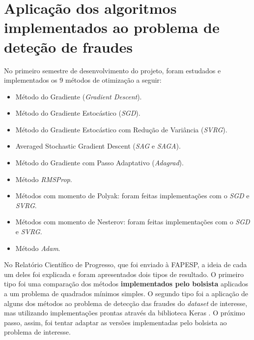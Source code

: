 \documentclass[11pt]{article}
\begin{document}
\section{Aplicação dos algoritmos implementados ao problema de deteção de fraudes}
No primeiro semestre de desenvolvimento do projeto, foram estudados e implementados os 9 métodos de otimização a seguir:
\begin{itemize}
\item Método do Gradiente (\textit{Gradient Descent}).
\item Método do Gradiente Estocástico (\textit{SGD}).
\item Método do Gradiente Estocástico com Redução de Variância (\textit{SVRG}).
\item Averaged Stochastic Gradient Descent (\textit{SAG} e \textit{SAGA}).
\item Método do Gradiente com Passo Adaptativo (\textit{Adagrad}).
\item Método \textit{RMSProp}.
\item Métodos com momento de Polyak: foram feitas implementações com o \textit{SGD} e \textit{SVRG}.
\item Métodos com momento de Nesterov: foram feitas implementações com o \textit{SGD} e \textit{SVRG}.
\item Método \textit{Adam}.
\end{itemize}
No Relatório Científico de Progresso, que foi enviado à FAPESP, a ideia de cada um deles foi explicada e foram apresentados dois tipos de resultado. O primeiro tipo foi uma comparação dos métodos \textbf{implementados pelo bolsista} aplicados a um problema de quadrados mínimos simples. O segundo tipo foi a aplicação de alguns dos métodos ao problema de detecção das fraudes do \textit{dataset} de interesse, mas utilizando implementações prontas através da biblioteca Keras \cite{KERAS}. O próximo passo, assim, foi tentar adaptar as versões implementadas pelo bolsista ao problema de interesse.
\end{document}
